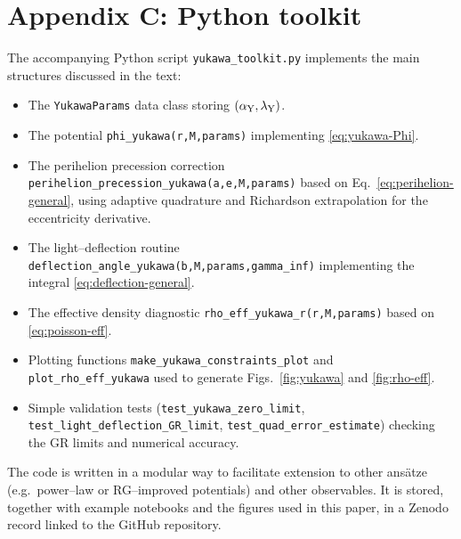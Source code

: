 \documentclass[11pt,a4paper]{article}
\begin{document}
\section*{Appendix C: Python toolkit}

The accompanying Python script \texttt{yukawa\_toolkit.py} implements the main structures discussed in the text:

\begin{itemize}[leftmargin=*]
\item The \texttt{YukawaParams} data class storing $(\alpha_{\rm Y},\lambda_{\rm Y})$.
\item The potential \texttt{phi\_yukawa(r,M,params)} implementing \eqref{eq:yukawa-Phi}.
\item The perihelion precession correction \texttt{perihelion\_precession\_yukawa(a,e,M,params)} based on Eq.~\eqref{eq:perihelion-general}, using adaptive quadrature and Richardson extrapolation for the eccentricity derivative.
\item The light--deflection routine \texttt{deflection\_angle\_yukawa(b,M,params,gamma\_inf)} implementing the integral \eqref{eq:deflection-general}.
\item The effective density diagnostic \texttt{rho\_eff\_yukawa\_r(r,M,params)} based on \eqref{eq:poisson-eff}.
\item Plotting functions \texttt{make\_yukawa\_constraints\_plot} and \texttt{plot\_rho\_eff\_yukawa} used to generate Figs.~\ref{fig:yukawa} and \ref{fig:rho-eff}.
\item Simple validation tests (\texttt{test\_yukawa\_zero\_limit}, \texttt{test\_light\_deflection\_GR\_limit}, \texttt{test\_quad\_error\_estimate}) checking the GR limits and numerical accuracy.
\end{itemize}

The code is written in a modular way to facilitate extension to other ans\"atze (e.g.\ power--law or RG--improved potentials) and other observables. It is stored, together with example notebooks and the figures used in this paper, in a Zenodo record linked to the GitHub repository.
\end{document}
